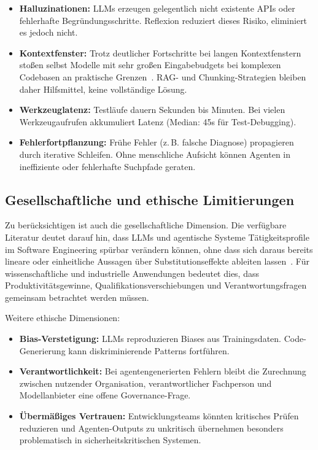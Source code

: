 \begin{itemize}
  \item \textbf{Halluzinationen:} LLMs erzeugen gelegentlich nicht existente APIs oder fehlerhafte Begründungsschritte. Reflexion reduziert dieses Risiko, eliminiert es jedoch nicht.
  
  \item \textbf{Kontextfenster:} Trotz deutlicher Fortschritte bei langen Kontextfenstern stoßen selbst Modelle mit sehr großen Eingabebudgets bei komplexen Codebasen an praktische Grenzen~\cite{meta2025llama4}. RAG- und Chunking-Strategien bleiben daher Hilfsmittel, keine vollständige Lösung.
  
  \item \textbf{Werkzeuglatenz:} Testläufe dauern Sekunden bis Minuten. Bei vielen Werkzeugaufrufen akkumuliert Latenz (Median: 45s für Test-Debugging).
  
  \item \textbf{Fehlerfortpflanzung:} Frühe Fehler (z.\,B. falsche Diagnose) propagieren durch iterative Schleifen. Ohne menschliche Aufsicht können Agenten in ineffiziente oder fehlerhafte Suchpfade geraten.
\end{itemize}

\subsection{Gesellschaftliche und ethische Limitierungen}

Zu berücksichtigen ist auch die gesellschaftliche Dimension. Die verfügbare Literatur deutet darauf hin, dass LLMs und agentische Systeme Tätigkeitsprofile im Software Engineering spürbar verändern können, ohne dass sich daraus bereits lineare oder einheitliche Aussagen über Substitutionseffekte ableiten lassen~\cite{eloundou2023gpts}. Für wissenschaftliche und industrielle Anwendungen bedeutet dies, dass Produktivitätsgewinne, Qualifikationsverschiebungen und Verantwortungsfragen gemeinsam betrachtet werden müssen.

Weitere ethische Dimensionen:

\begin{itemize}
  \item \textbf{Bias-Verstetigung:} LLMs reproduzieren Biases aus Trainingsdaten. Code-Generierung kann diskriminierende Patterns fortführen.
  
  \item \textbf{Verantwortlichkeit:} Bei agentengenerierten Fehlern bleibt die Zurechnung zwischen nutzender Organisation, verantwortlicher Fachperson und Modellanbieter eine offene Governance-Frage.
  
  \item \textbf{Übermäßiges Vertrauen:} Entwicklungsteams könnten kritisches Prüfen reduzieren und Agenten-Outputs zu unkritisch übernehmen \textendash{} besonders problematisch in sicherheitskritischen Systemen.
\end{itemize}

